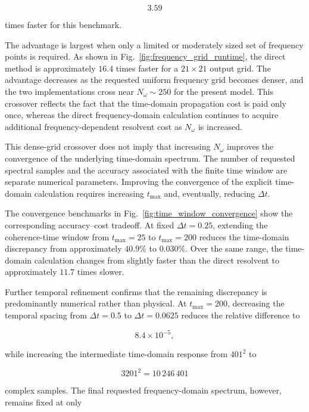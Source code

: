 \documentclass[11pt]{article}
\begin{document}
\begin{equation}
\boxed{
3.59
}
\end{equation}

times faster for this benchmark.

The advantage is largest when only a limited or moderately sized set
of frequency points is required.  As shown in
Fig.~\ref{fig:frequency_grid_runtime}, the direct method is
approximately $16.4$ times faster for a $21\times21$ output grid.
The advantage decreases as the requested uniform frequency grid
becomes denser, and the two implementations cross near
$N_\omega\sim250$ for the present model.  This crossover reflects the
fact that the time-domain propagation cost is paid only once, whereas
the direct frequency-domain calculation continues to acquire
additional frequency-dependent resolvent cost as $N_\omega$ is
increased.

This dense-grid crossover does not imply that increasing
$N_\omega$ improves the convergence of the underlying time-domain
spectrum.  The number of requested spectral samples and the accuracy
associated with the finite time window are separate numerical
parameters.  Improving the convergence of the explicit time-domain
calculation requires increasing $t_{\max}$ and, eventually, reducing
$\Delta t$.

The convergence benchmarks in
Fig.~\ref{fig:time_window_convergence} show the corresponding
accuracy--cost tradeoff.  At fixed $\Delta t=0.25$, extending the
coherence-time window from $t_{\max}=25$ to $t_{\max}=200$ reduces the
time-domain discrepancy from approximately $40.9\%$ to $0.030\%$.
Over the same range, the time-domain calculation changes from slightly
faster than the direct resolvent to approximately $11.7$ times slower.

Further temporal refinement confirms that the remaining discrepancy is
predominantly numerical rather than physical.  At
$t_{\max}=200$, decreasing the temporal spacing from
$\Delta t=0.5$ to $\Delta t=0.0625$ reduces the relative difference to

\begin{equation}
\boxed{
8.4\times10^{-5},
}
\end{equation}

while increasing the intermediate time-domain response from
$401^2$ to

\begin{equation}
3201^2
=
10\,246\,401
\end{equation}

complex samples.  The final requested frequency-domain spectrum,
however, remains fixed at only
\end{document}
